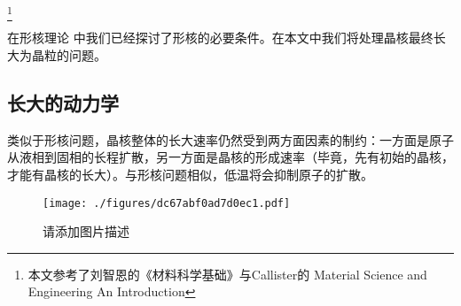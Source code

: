
\footnote{本文参考了刘智恩的《材料科学基础》与Callister的 Material Science and Engineering An Introduction}

在形核理论  中我们已经探讨了形核的必要条件。在本文中我们将处理晶核最终长大为晶粒的问题。

\subsection{长大的动力学}
类似于形核问题，晶核整体的长大速率仍然受到两方面因素的制约：一方面是原子从液相到固相的长程扩散，另一方面是晶核的形成速率（毕竟，先有初始的晶核，才能有晶核的长大）。与形核问题相似，低温将会抑制原子的扩散。

\begin{figure}[ht]
\centering
\texttt{[image: ./figures/dc67abf0ad7d0ec1.pdf]}
\caption{请添加图片描述} \label{fig_GGRW_1}
\end{figure}